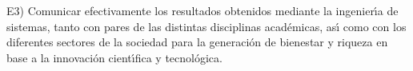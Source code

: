 E3) Comunicar efectivamente los resultados obtenidos mediante la
ingenier\'{\i}a de sistemas, tanto con pares de las distintas
disciplinas acad\'{e}micas, as\'{\i} como con los diferentes sectores
de la sociedad para la generaci\'{o}n de bienestar y riqueza en base a
la innovaci\'{o}n cient\'{\i}fica y tecnol\'{o}gica.
